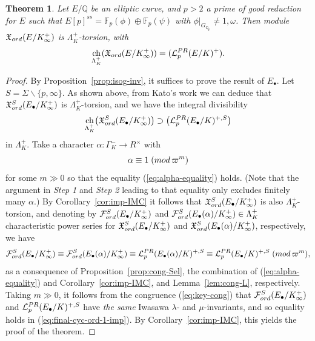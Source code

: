 \documentclass[a4paper,10pt]{amsart}
\numberwithin{equation}{section}
\numberwithin{equation}{section}
\theoremstyle{plain}
\newtheorem{thm}{Theorem}[subsection] %
\theoremstyle{definition}
\theoremstyle{definition}
\theoremstyle{plain}
\theoremstyle{plain}
\theoremstyle{plain}
\theoremstyle{plain}
\newcommand{\Q}{\mathbb{Q}}
\newcommand{\X}{\mathfrak{X}}
\DeclareMathOperator{\ch}{ch}
\newcommand{\Lcal}{\mathcal{L}}
\newcommand{\Fcal}{\mathcal{F}}
\begin{document}
\begin{thm}\label{thm:PR-IMC}
Let $E/\Q$ be an elliptic curve, and $p>2$ a prime of good reduction for $E$ such that $E[p]^{ss}=\mathbb{F}_p(\phi)\oplus\mathbb{F}_p(\psi)$ 
with $\phi\vert_{G_{\Q_p}}\neq 1,\omega$. 
Then module $\X_{\rm ord}(E/K_\infty^+)$ is $\Lambda_K^+$-torsion, with
\[
\ch_{\Lambda_K^+}(\X_{\rm ord}(E/K_\infty^+))=(\Lcal_p^{\rm PR}(E/K)^+).
\]
\end{thm}

\begin{proof}
By Proposition~\ref{prop:isog-inv}, it suffices to prove the result of $E_\bullet$. Let $S=\Sigma\smallsetminus\{p,\infty\}$. As shown above, from Kato's work we can deduce that $\X_{\rm ord}^S(E_\bullet/K_\infty^+)$ is $\Lambda_K^+$-torsion, and we have the integral divisibility
\[
\ch_{\Lambda_K^+}\bigl(\X_{\rm ord}^S(E_\bullet/K_\infty^+)\bigr)\supset\bigl(\Lcal_p^{\rm PR}(E_\bullet/K)^{+,S}\bigr)
\]
in $\Lambda_K^+$. Take a character $\alpha:\Gamma_K^-\rightarrow R^\times$ with 
\[
\alpha\equiv 1\;({\rm mod}\,\varpi^m)
\] 
for some $m\gg 0$ so that the equality (\ref{eq:alpha-equality}) holds. (Note that the argument in \emph{Step 1} and \emph{Step 2} leading to that equality only excludes finitely many $\alpha$.) By Corollary~\ref{cor:imp-IMC} it follows that $\X_{\rm ord}^S(E_\bullet/K_\infty^+)$ is also $\Lambda_K^+$-torsion, and denoting by $\Fcal_{\rm ord}^S(E_\bullet/K_\infty^+)$ and $\Fcal^S_{\rm ord}(E_\bullet(\alpha)/K_\infty^+)\in\Lambda_K^+$ characteristic power series for $\X^S_{\rm ord}(E_\bullet/K_\infty^+)$ and $\X^S_{\rm ord}(E_\bullet(\alpha)/K_\infty^+)$, respectively, we have 
\begin{equation}\label{eq:key-cong}
\Fcal^S_{\rm ord}(E_\bullet/K_\infty^+)\equiv\Fcal^S_{\rm ord}(E_\bullet(\alpha)/K_\infty^+)\equiv\Lcal_p^{\rm PR}(E_\bullet(\alpha)/K)^{+,S}\equiv\Lcal_p^{\rm PR}(E_\bullet/K)^{+,S}\;({\rm mod}\,\varpi^m),
\end{equation}
as a consequence of Proposition~\ref{prop:cong-Sel}, the combination of (\ref{eq:alpha-equality}) and Corollary~\ref{cor:imp-IMC}, and Lemma~\ref{lem:cong-L}, respectively. Taking $m\gg 0$, it follows from the congruence (\ref{eq:key-cong}) that $\Fcal_{\rm ord}^S(E_\bullet/K_\infty^+)$ and $\Lcal_p^{\rm PR}(E_\bullet/K)^{+,S}$ have \emph{the same} Iwasawa $\lambda$- and $\mu$-invariants, and so equality holds in (\ref{eq:final-cyc-ord-1-imp}). By Corollary~\ref{cor:imp-IMC}, this yields the proof of the theorem.
\end{proof}
\end{document}

